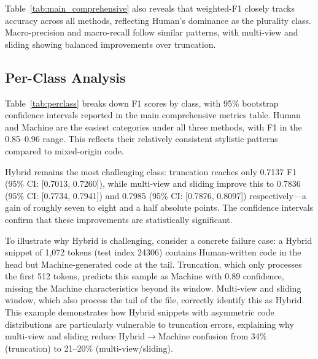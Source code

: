 \documentclass[conference]{IEEEtran}
\begin{document}
Table~\ref{tab:main_comprehensive} also reveals that weighted-F1 closely tracks accuracy across all methods, reflecting Human's dominance as the plurality class. Macro-precision and macro-recall follow similar patterns, with multi-view and sliding showing balanced improvements over truncation.

\begin{table}[htbp]
  \centering
  \caption{Comprehensive performance metrics on the held-out test set ($n{=}33{,}742$). One training epoch per model.}
  \label{tab:main_comprehensive}
  \footnotesize
  \setlength{\tabcolsep}{2.5pt}
\end{table}



\subsection{Per-Class Analysis}

Table~\ref{tab:perclass} breaks down F1 scores by class, with 95\% bootstrap confidence intervals reported in the main comprehensive metrics table. Human and Machine are the easiest categories under all three methods, with F1 in the 0.85--0.96 range. This reflects their relatively consistent stylistic patterns compared to mixed-origin code.

Hybrid remains the most challenging class: truncation reaches only 0.7137 F1 (95\% CI: [0.7013, 0.7260]), while multi-view and sliding improve this to 0.7836 (95\% CI: [0.7734, 0.7941]) and 0.7985 (95\% CI: [0.7876, 0.8097]) respectively---a gain of roughly seven to eight and a half absolute points. The confidence intervals confirm that these improvements are statistically significant.

To illustrate why Hybrid is challenging, consider a concrete failure case: a Hybrid snippet of 1,072 tokens (test index 24306) contains Human-written code in the head but Machine-generated code at the tail. Truncation, which only processes the first 512 tokens, predicts this sample as Machine with 0.89 confidence, missing the Machine characteristics beyond its window. Multi-view and sliding window, which also process the tail of the file, correctly identify this as Hybrid. This example demonstrates how Hybrid snippets with asymmetric code distributions are particularly vulnerable to truncation errors, explaining why multi-view and sliding reduce Hybrid$\rightarrow$Machine confusion from 34\% (truncation) to 21--20\% (multi-view/sliding).
\end{document}
